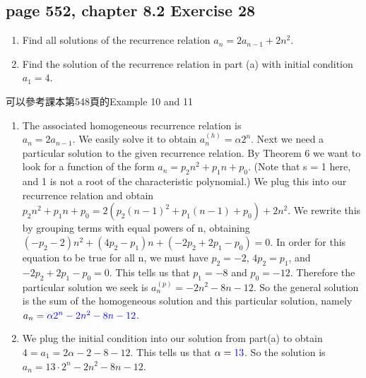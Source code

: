 \documentclass[sigconf]{acmart}
\newcommand{\answer}[2]{%
  \if\relax\detokenize{#2}\relax
    \underline{\mbox{請作答}}%
  \else
    \textcolor{blue}{#2}%
  \fi
}
\begin{document}
\subsection{page 552, chapter 8.2 Exercise 28}
\begin{shaded}
    \begin{enumerate}[label=(\alph*)]
        \item Find all solutions of the recurrence relation $a_n = 2a_{n-1} + 2n^2$.
        \item Find the solution of the recurrence relation in part (a) with initial condition $a_1 = 4$.
    \end{enumerate}
\end{shaded}
可以參考課本第548頁的Example 10 and 11
\begin{enumerate}[label=(\alph*)]
        \item The associated homogeneous recurrence relation is \\
        $a_n = 2a_{n-1}$. We easily solve it to obtain $a_n^{(h)} = \alpha2^n$. Next we need a particular solution to the given recurrence relation. By Theorem 6 we want to look for a function of the form $a_n = p_2n^2 + p_1n + p_0$. (Note that s = 1 here, and 1 is not a root of the characteristic polynomial.) We plug this into our recurrence relation and obtain $p_2n^2 + p_1n + p_0 = 2(p_2(n-1)^2 + p_1(n-1) + p_0) + 2n^2$. We rewrite this by grouping terms with equal powers of n, obtaining $(-p_2-2)n^2 + (4p_2-p_1)n + (-2p_2 + 2p_1-p_0) = 0$. In order for this equation to be true for all n, we must have $p_2 = -2$, $4p_2 = p_1$, and $-2p_2 + 2p_1 - p_0 = 0$. This tells us that $p_1 = -8$ and $p_0 = -12$. Therefore the particular solution we seek is $a_n^{(p)} = -2n^2 - 8n - 12$. So the general solution is the sum of the homogeneous solution and this particular solution, namely $a_n = \answer{8.2.28a}{\alpha2^n - 2n^2 - 8n - 12}$.
        \item We plug the initial condition into our solution from part(a) to obtain $4 = a_1 = 2\alpha - 2 - 8 - 12$. This tells us that $\alpha = \answer{8.2.28b}{13}$. So the solution is $a_n = 13\cdot2^n - 2n^2 - 8n - 12$.
\end{enumerate}
\end{document}
